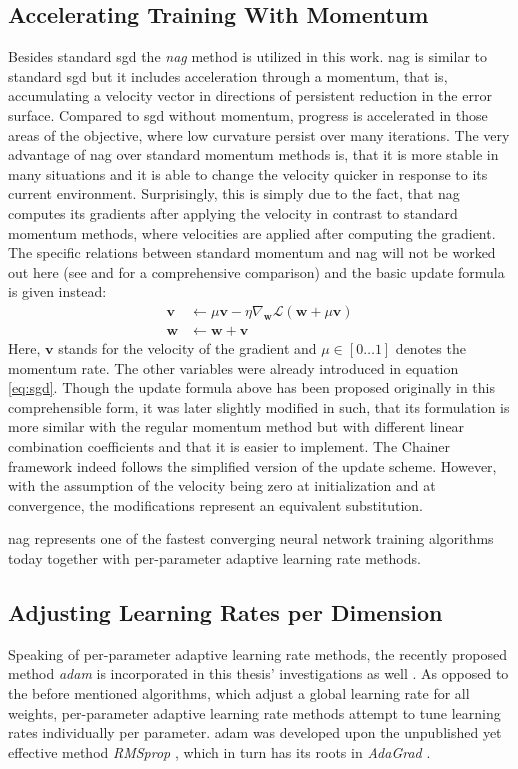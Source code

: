 \subsection{Accelerating Training With Momentum}
Besides standard \gls{sgd} the \textit{\gls{nag}} method \cite{Nesterov1983} is utilized in this work.
\gls{nag} is similar to standard \gls{sgd} but it includes acceleration through a momentum, that is, accumulating a velocity vector in directions of persistent reduction in the error surface.
Compared to \gls{sgd} without momentum, progress is accelerated in those areas of the objective, where low curvature persist over many iterations.
The very advantage of \gls{nag} over standard momentum methods is, that it is more stable in many situations and it is able to change the velocity quicker in response to its current environment.
Surprisingly, this is simply due to the fact, that \gls{nag} computes its gradients after applying the velocity in contrast to standard momentum methods, where velocities are applied after computing the gradient.
The specific relations between standard momentum and \gls{nag} will not be worked out here (see \cite{Suts2013} and \cite{SuMa2013} for a comprehensive comparison) and the basic update formula is given instead:
\begin{align}
	\bm v&\gets\mu\bm v - \eta\nabla_{\bm w}\mathcal L\left(\bm w + \mu\bm v\right)\\
	\bm w&\gets\bm w + \bm v
\end{align} 
Here, $\bm v$ stands for the velocity of the gradient and $\mu\in{[0\dots1]}$ denotes the momentum rate.
The other variables were already introduced in equation \ref{eq:sgd}.
Though the update formula above has been proposed originally in this comprehensible form, it was later slightly modified in \cite{BeBou2013} such, that its formulation is more similar with the regular momentum method but with different linear combination coefficients and that it is easier to implement.
The Chainer framework indeed follows the simplified version of the update scheme.
However, with the assumption of the velocity being zero at initialization and at convergence, the modifications represent an equivalent substitution.

\gls{nag} represents one of the fastest converging neural network training algorithms today together with per-parameter adaptive learning rate methods.

\subsection{Adjusting Learning Rates per Dimension}
Speaking of per-parameter adaptive learning rate methods, the recently proposed method \textit{\gls{adam}} is incorporated in this thesis' investigations as well \cite{KiBa2014}.
As opposed to the before mentioned algorithms, which adjust a global learning rate for all weights, per-parameter adaptive learning rate methods attempt to tune learning rates individually per parameter.
\gls{adam} was developed upon the unpublished yet effective method \textit{RMSprop} \cite{HiNi2012}, which in turn has its roots in \textit{AdaGrad} \cite{DuHa2011}.


